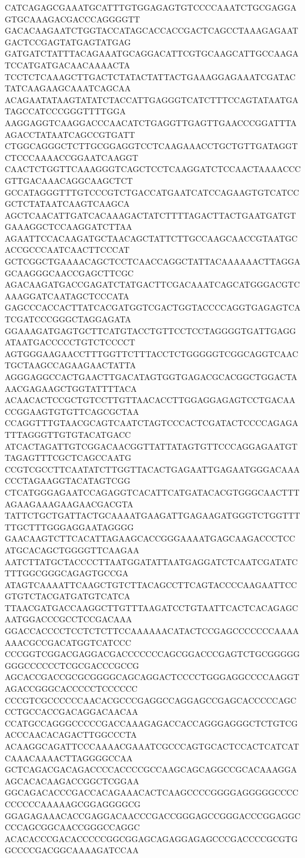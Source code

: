 CATCAGAGCGAAATGCATTTGTGGAGAGTGTCCCCAAATCTGCGAGGAGTGCAAAGACGACCCAGGGGTT
GACACAAGAATCTGGTACCATAGCACCACCGACTCAGCCTAAAGAGAATGACTCCGAGTATGAGTATGAG
GATGATCTATTTACAGAAATGCAGGACATTCGTGCAAGCATTGCCAAGATCCATGATGACAACAAAACTA
TCCTCTCAAAGCTTGACTCTATACTATTACTGAAAGGAGAAATCGATACTATCAAGAAGCAAATCAGCAA
ACAGAATATAAGTATATCTACCATTGAGGGTCATCTTTCCAGTATAATGATAGCCATCCCGGGTTTTGGA
AAGGAGGTCAAGGACCCAACATCTGAGGTTGAGTTGAACCCGGATTTAAGACCTATAATCAGCCGTGATT
CTGGCAGGGCTCTTGCGGAGGTCCTCAAGAAACCTGCTGTTGATAGGTCTCCCAAAACCGGAATCAAGGT
CAACTCTGGTTCAAAGGGTCAGCTCCTCAAGGATCTCCAACTAAAACCCGTTGACAAACAGGCAAGCTCT
GCCATAGGGTTTGTCCCGTCTGACCATGAATCATCCAGAAGTGTCATCCGCTCTATAATCAAGTCAAGCA
AGCTCAACATTGATCACAAAGACTATCTTTTAGACTTACTGAATGATGTGAAAGGCTCCAAGGATCTTAA
AGAATTCCACAAGATGCTAACAGCTATTCTTGCCAAGCAACCGTAATGCACCGCCCAATCAACTTCCCAT
GCTCGGCTGAAAACAGCTCCTCAACCAGGCTATTACAAAAAACTTAGGAGCAAGGGCAACCGAGCTTCGC
AGACAAGATGACCGAGATCTATGACTTCGACAAATCAGCATGGGACGTCAAAGGATCAATAGCTCCCATA
GAGCCCACCACTTATCACGATGGTCGACTGGTACCCCAGGTGAGAGTCATCGATCCCGGGCTAGGAGATA
GGAAAGATGAGTGCTTCATGTACCTGTTCCTCCTAGGGGTGATTGAGGATAATGACCCCCTGTCTCCCCT
AGTGGGAAGAACCTTTGGTTCTTTACCTCTGGGGGTCGGCAGGTCAACTGCTAAGCCAGAAGAACTATTA
AGGGAGGCCACTGAACTTGACATAGTGGTGAGACGCACGGCTGGACTAAACGAGAAGCTGGTATTTTACA
ACAACACTCCGCTGTCCTTGTTAACACCTTGGAGGAGAGTCCTGACAACCGGAAGTGTGTTCAGCGCTAA
CCAGGTTTGTAACGCAGTCAATCTAGTCCCACTCGATACTCCCCAGAGATTTAGGGTTGTGTACATGACC
ATCACTAGATTGTCGGACAACGGTTATTATAGTGTTCCCAGGAGAATGTTAGAGTTTCGCTCAGCCAATG
CCGTCGCCTTCAATATCTTGGTTACACTGAGAATTGAGAATGGGACAAACCCTAGAAGGTACATAGTCGG
CTCATGGGAGAATCCAGAGGTCACATTCATGATACACGTGGGCAACTTTAGAAGAAAGAAGAACGACGTA
TATTCTGCTGATTACTGCAAAATGAAGATTGAGAAGATGGGTCTGGTTTTTGCTTTGGGAGGAATAGGGG
GAACAAGTCTTCACATTAGAAGCACCGGGAAAATGAGCAAGACCCTCCATGCACAGCTGGGGTTCAAGAA
AATCTTATGCTACCCCTTAATGGATATTAATGAGGATCTCAATCGATATCTTTGGCGGGCAGAGTGCCGA
ATAGTCAAAATTCAAGCTGTCTTACAGCCTTCAGTACCCCAAGAATTCCGTGTCTACGATGATGTCATCA
TTAACGATGACCAAGGCTTGTTTAAGATCCTGTAATTCACTCACAGAGCAATGGACCCGCCTCCGACAAA
GGACCACCCCTCCTCTCTTCCAAAAAACATACTCCGAGCCCCCCCAAAAAAACGCCGACATGGTCATCCC
CCCGGTCGGACGAGGACGACCCCCCCAGCGGACCCGAGTCTGCGGGGGGGGCCCCCCTCGCGACCCGCCG
AGCACCGACCGCGCGGGGCAGCAGGACTCCCCTGGGAGGCCCCAAGGTAGACCGGGCACCCCCTCCCCCC
CCCGTCGCCCCCCAACACGCCCGAGGCCAGGAGCCGAGCACCCCCAGCCCTGCCACCGACAGGACAACAA
CCATGCCAGGGCCCCCGACCAAAGAGACCACCAGGGAGGGCTCTGTCGACCCAACACAGACTTGGCCCTA
ACAAGGCAGATTCCCAAAACGAAATCGCCCAGTGCACTCCACTCATCATCAAACAAAACTTAGGGGCCAA
GCTCAGACGACAGACCCCACCCCGCCAAGCAGCAGGCCGCACAAAGGAAGCACACAAGACCGGCTCGGAA
GGCAGACACCCGACCACAGAAACACTCAAGCCCCGGGGAGGGGGCCCCCCCCCCAAAAAGCGGAGGGGCG
GGAGAGAAACACCGAGGACAACCCGACCGGGAGCCGGGACCCGGAGGCCCCAGCGGCAACCGGGCCAGGC
ACACACCCGACACCCCCGGCGGAGCAGAGGAGAGCCCGACCCCGCGTGGCCCCGACGGCAAAAGATCCAA
